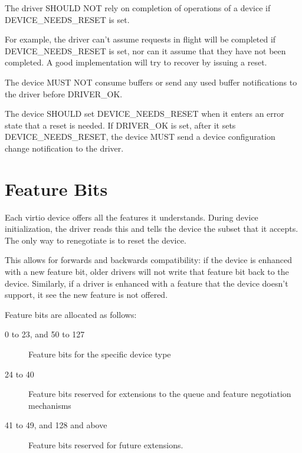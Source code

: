 The driver SHOULD NOT rely on completion of operations of a
device if DEVICE_NEEDS_RESET is set.
\begin{note}
For example, the driver can't assume requests in flight will be
completed if DEVICE_NEEDS_RESET is set, nor can it assume that
they have not been completed.  A good implementation will try to
recover by issuing a reset.
\end{note}


The device MUST NOT consume buffers or send any used buffer
notifications to the driver before DRIVER_OK.

\label{sec:Basic Facilities of a Virtio Device / Device Status Field / DEVICENEEDSRESET}The device SHOULD set DEVICE_NEEDS_RESET when it enters an error state
that a reset is needed.  If DRIVER_OK is set, after it sets DEVICE_NEEDS_RESET, the device
MUST send a device configuration change notification to the driver.

\section{Feature Bits}\label{sec:Basic Facilities of a Virtio Device / Feature Bits}

Each virtio device offers all the features it understands.  During
device initialization, the driver reads this and tells the device the
subset that it accepts.  The only way to renegotiate is to reset
the device.

This allows for forwards and backwards compatibility: if the device is
enhanced with a new feature bit, older drivers will not write that
feature bit back to the device.  Similarly, if a driver is enhanced with a feature
that the device doesn't support, it see the new feature is not offered.

Feature bits are allocated as follows:

\begin{description}
\item[0 to 23, and 50 to 127] Feature bits for the specific device type

\item[24 to 40] Feature bits reserved for extensions to the queue and
  feature negotiation mechanisms

\item[41 to 49, and 128 and above] Feature bits reserved for future extensions.
\end{description}


